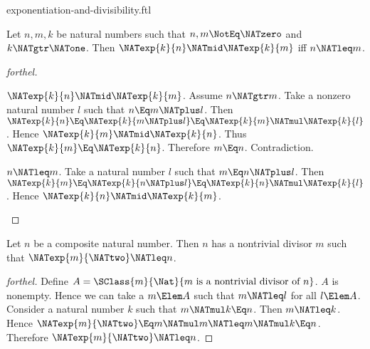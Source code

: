 \documentclass{stex}
\begin{document}
\begin{smodule}{exponentiation-and-divisibility.ftl}

\begin{proposition}[forthel,id=ARITHMETIC_13_8426075493236736]
  Let $n, m, k$ be natural numbers such that $n, m \NotEq \NATzero$ and $k \NATgtr \NATone$.
  Then $\NATexp{k}{n} \NATmid \NATexp{k}{m}$ iff $n \NATleq m$.
\end{proposition}
\begin{proof}[forthel]
  \begin{case}{$\NATexp{k}{n} \NATmid \NATexp{k}{m}$.}
    Assume $n \NATgtr m$.
    Take a nonzero natural number $l$ such that $n \Eq m \NATplus l$.
    Then $\NATexp{k}{n}
      \Eq \NATexp{k}{m \NATplus l}
      \Eq \NATexp{k}{m} \NATmul \NATexp{k}{l}$.
    Hence $\NATexp{k}{m} \NATmid \NATexp{k}{n}$.
    Thus $\NATexp{k}{m} \Eq \NATexp{k}{n}$.
    Therefore $m \Eq n$.
    Contradiction.
  \end{case}

  \begin{case}{$n \NATleq m$.}
    Take a natural number $l$ such that $m \Eq n \NATplus l$.
    Then $\NATexp{k}{m}
      \Eq \NATexp{k}{n \NATplus l}
      \Eq \NATexp{k}{n} \NATmul \NATexp{k}{l}$.
    Hence $\NATexp{k}{n} \NATmid \NATexp{k}{m}$.
  \end{case}
\end{proof}

\begin{proposition}[forthel,id=ARITHMETIC_13_797196163219456]
  Let $n$ be a composite natural number.
  Then $n$ has a nontrivial divisor $m$ such that $\NATexp{m}{\NATtwo} \NATleq n$.
\end{proposition}
\begin{proof}[forthel]
  Define $A = \SClass{m}{\Nat}{m\text{ is a nontrivial divisor of }n}$.
  $A$ is nonempty.
  Hence we can take a $m \Elem A$ such that $m \NATleq l$ for all $l \Elem A$.
  Consider a natural number $k$ such that $m \NATmul k \Eq n$.
  Then $m \NATleq k$.
  Hence $\NATexp{m}{\NATtwo} \Eq m \NATmul m \NATleq m \NATmul k \Eq n$.
  Therefore $\NATexp{m}{\NATtwo} \NATleq n$.
\end{proof}
\end{smodule}
\end{document}
